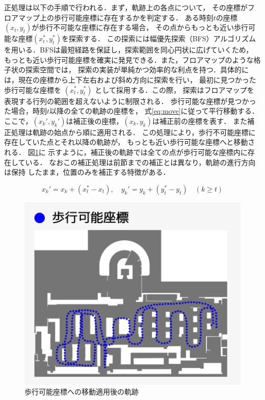 正処理は以下の手順で行われる．まず，軌跡上の各点について，
その座標がフロアマップ上の歩行可能座標に存在するかを判定する．
ある時刻$t$の座標$(x_t, y_t)$が歩行不可能な座標に存在する場合，
その点からもっとも近い歩行可能な座標$(x_t^*, y_t^*)$を探索する．
この探索には幅優先探索（BFS）アルゴリズムを用いる．BFSは最短経路を保証し，探索範囲を同心円状に広げていくため，
もっとも近い歩行可能座標を確実に発見できる．また，フロアマップのような格子状の探索空間では，
探索の実装が単純かつ効率的な利点を持つ．具体的には，現在の座標から上下左右および斜め方向に探索を行い，
最初に見つかった歩行可能な座標を $(x_t^*, y_t^*)$ として採用する．この際，
探索はフロアマップを表現する行列の範囲を超えないように制限される．
歩行可能な座標が見つかった場合，時刻$t$以降の全ての軌跡の座標を，
式\ref{eq:move}に従って平行移動する．
ここで，$(x_k', y_k')$は補正後の座標，$(x_k, y_k)$は補正前の座標を表す．
また補正処理は軌跡の始点から順に適用される．%
この処理により，歩行不可能座標に存在していた点とそれ以降の軌跡が，
もっとも近い歩行可能な座標へと移動される．
図\ref{fig:walkable-points}に
示すように，補正後の軌跡では全ての点が歩行可能な座標内に存在している．
なおこの補正処理は前節までの補正とは異なり，軌跡の進行方向は保持
したまま，位置のみを補正する特徴がある．




\begin{equation}
  \label{eq:move}
x_k' = x_k + (x_t^* - x_t), \quad y_k' = y_k + (y_t^* - y_t) \quad (k \geq t)
\end{equation}


\begin{figure}[H]
    \centering
    \includegraphics[width=\linewidth]{../image/walkable-points.jpg}
    \caption{歩行可能座標への移動適用後の軌跡}    \label{fig:walkable-points}
\end{figure}
